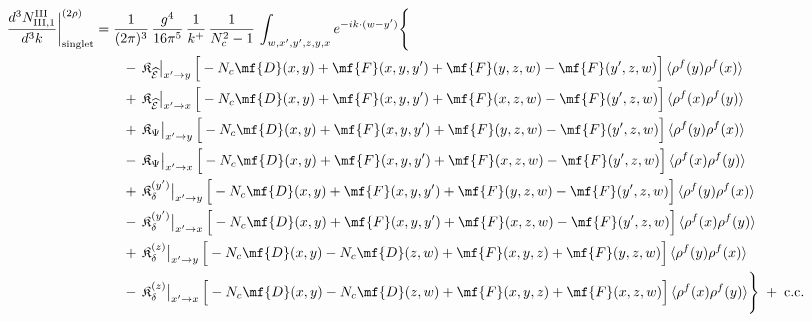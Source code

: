 {\begin{align}
\frac{d^{3}N^{\rm III}_{{\rm III},1}}{d^{3}k}\bigg|^{(2\rho)}_{\rm singlet}&=\frac{1}{(2\pi)^{3}}\,\frac{g^{4}}{16\pi^{5}}\,\frac{1}{k^{+}}\,\frac{1}{N_{c}^{2}-1}\,\int_{w,x',y',z,y,x}e^{-ik\cdot(w-y')}\Bigg\{\notag\\
&\qquad -\,\mathfrak{K}_{\widehat{\mathcal{E}}}\big|_{x'\to y}\,\Big[-N_{c}\mf{D}(x,y)+\mf{F}(x,y,y')+\mf{F}(y,z,w)-\mf{F}(y',z,w)\Big]\,\langle\rho^{f}(y)\rho^{f}(x)\rangle\notag\\
&\qquad +\,\mathfrak{K}_{\widehat{\mathcal{E}}}\big|_{x'\to x}\,\Big[-N_{c}\mf{D}(x,y)+\mf{F}(x,y,y')+\mf{F}(x,z,w)-\mf{F}(y',z,w)\Big]\,\langle\rho^{f}(x)\rho^{f}(y)\rangle\notag\\
&\qquad +\,\mathfrak{K}_{\Psi}\big|_{x'\to y}\,\Big[-N_{c}\mf{D}(x,y)+\mf{F}(x,y,y')+\mf{F}(y,z,w)-\mf{F}(y',z,w)\Big]\,\langle\rho^{f}(y)\rho^{f}(x)\rangle\notag\\
&\qquad -\,\mathfrak{K}_{\Psi}\big|_{x'\to x}\,\Big[-N_{c}\mf{D}(x,y)+\mf{F}(x,y,y')+\mf{F}(x,z,w)-\mf{F}(y',z,w)\Big]\,\langle\rho^{f}(x)\rho^{f}(y)\rangle\notag\\
&\qquad +\,\mathfrak{K}_{\delta}^{(y')}\big|_{x'\to y}\,\Big[-N_{c}\mf{D}(x,y)+\mf{F}(x,y,y')+\mf{F}(y,z,w)-\mf{F}(y',z,w)\Big]\,\langle\rho^{f}(y)\rho^{f}(x)\rangle\notag\\
&\qquad -\,\mathfrak{K}_{\delta}^{(y')}\big|_{x'\to x}\,\Big[-N_{c}\mf{D}(x,y)+\mf{F}(x,y,y')+\mf{F}(x,z,w)-\mf{F}(y',z,w)\Big]\,\langle\rho^{f}(x)\rho^{f}(y)\rangle\notag\\
&\qquad +\,\mathfrak{K}_{\delta}^{(z)}\big|_{x'\to y}\,\Big[-N_{c}\mf{D}(x,y)-N_{c}\mf{D}(z,w)+\mf{F}(x,y,z)+\mf{F}(y,z,w)\Big]\,\langle\rho^{f}(y)\rho^{f}(x)\rangle\notag\\
&\qquad -\,\mathfrak{K}_{\delta}^{(z)}\big|_{x'\to x}\,\Big[-N_{c}\mf{D}(x,y)-N_{c}\mf{D}(z,w)+\mf{F}(x,y,z)+\mf{F}(x,z,w)\Big]\,\langle\rho^{f}(x)\rho^{f}(y)\rangle\Bigg\}\;+\;{\rm c.c.}\label{eq:s-III-III-1}
\end{align}

}
